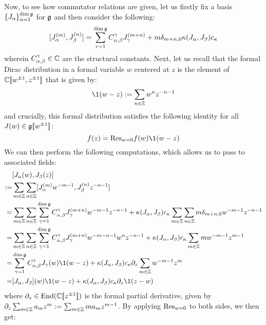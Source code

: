         Now, to see how commutator relations are given, let us firstly fix a basis $\{J_{\alpha}\}_{\alpha = 1}^{\dim \mathfrak{g}}$ for $\mathfrak{g}$ and then consider the following:
            $$[J_{\alpha}^{(m)}, J_{\beta}^{(n)}] = \sum_{r = 1}^{\dim \mathfrak{g}} C_{\alpha, \beta}^{\gamma} J_{\gamma}^{(m + n)} + m \delta_{m + n, 0} \kappa(J_{\alpha}, J_{\beta}) c_{\kappa}$$
        wherein $C_{\alpha, \beta}^{\gamma} \in \mathbb{C}$ are the structural constants. Next, let us recall that the formal Dirac distribution in a formal variable $w$ centered at $z$ is the element of $\mathbb{C}[\![w^{\pm 1}, z^{\pm 1}]\!]$ that is given by:
            $$\1(w - z) := \sum_{n \in \Z} w^n z^{-n - 1}$$
        and crucially, this formal distribution satisfies the following identity for all $J(w) \in \mathfrak{g}[\![w^{\pm 1}]\!]$:
            $$f(z) = \Res_{w = 0} f(w) \1(w - z)$$
        We can then perform the following computations, which allows us to pass to associated fields:
            $$
                \begin{aligned}
                    & [J_{\alpha}(w), J_{\beta}(z)]
                    \\
                    := & \sum_{m \in \Z} \sum_{n \in \Z} [J_{\alpha}^{(m)} w^{-m - 1}, J_{\beta}^{(n)} z^{-n - 1}]
                    \\
                    = & \sum_{m \in \Z} \sum_{n \in \Z} \sum_{\gamma = 1}^{\dim \g} C_{\alpha, \beta}^{\gamma} J_{\gamma}^{(m + n)} w^{-m - 1} z^{-n - 1} + \kappa(J_{\alpha}, J_{\beta}) c_{\kappa} \sum_{m \in \Z} \sum_{n \in \Z} m \delta_{m + n, 0} w^{-m - 1} z^{-n - 1}
                    \\
                    = & \sum_{m \in \Z} \sum_{n \in \Z} \sum_{\gamma = 1}^{\dim \g} C_{\alpha, \beta}^{\gamma} J_{\gamma}^{(m + n)} w^{-m - n - 1} w^n z^{-n - 1} + \kappa(J_{\alpha}, J_{\beta}) c_{\kappa} \sum_{m \in \Z} m w^{-m - 1} z^{m - 1}
                    \\
                    = & \sum_{\gamma = 1}^{\dim \g} C_{\alpha, \beta}^{\gamma} J_{\gamma}(w) \1(w - z) + \kappa(J_{\alpha}, J_{\beta}) c_{\kappa} \del_z \sum_{m \in \Z} w^{-m - 1} z^m
                    \\
                    = & [J_{\alpha}, J_{\beta}](w) \1(w - z) + \kappa(J_{\alpha}, J_{\beta}) c_{\kappa} \del_z \1(z - w)
                \end{aligned}
            $$
        where $\partial_z \in \mathrm{End}( \mathbb{C}[\![z^{\pm 1}]\!] )$ is the formal partial derivative, given by $\partial_z \sum_{m \in \mathbb{Z}} a_m z^m := \sum_{m \in \mathbb{Z}} m a_m z^{m - 1}$. By applying $\mathrm{Res}_{w = 0}$ to both sides, we then get:
